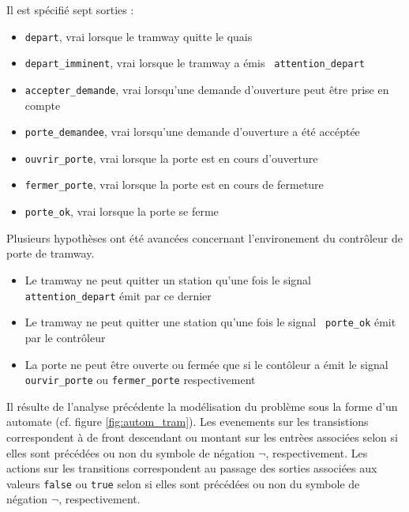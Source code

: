 \documentclass{article}
\begin{document}
      Il est spécifié sept sorties :
      \begin{itemize}
        \item {\tt depart}, vrai lorsque le tramway quitte le quais
        \item {\tt depart\_imminent}, vrai lorsque le tramway a émis {\tt
          attention\_depart} 
        \item {\tt accepter\_demande}, vrai lorsqu'une demande d'ouverture peut
          être prise en compte
        \item {\tt porte\_demandee}, vrai lorsqu'une demande d'ouverture a été
          accéptée 
        \item {\tt ouvrir\_porte}, vrai lorsque la porte est en cours d'ouverture
        \item {\tt fermer\_porte}, vrai lorsque la porte est en cours de fermeture
        \item {\tt porte\_ok}, vrai lorsque la porte se ferme
      \end{itemize} \vspace{1em}

      Plusieurs hypothèses ont été avancées concernant l'environement du
      contrôleur de porte de tramway.
      \begin{itemize}
        \item Le tramway ne peut quitter un station qu'une fois le signal {\tt
          attention\_depart} émit par ce dernier
        \item Le tramway ne peut quitter une station qu'une fois le signal {\tt
          porte\_ok} émit par le contrôleur
        \item La porte ne peut être ouverte ou fermée que si le contôleur a émit
          le signal {\tt ourvir\_porte} ou {\tt fermer\_porte} respectivement
      \end{itemize} \vspace{1em}


      Il résulte de l'analyse précédente la modélisation du problème sous la
      forme d'un automate (cf. figure \ref{fig:autom_tram}).  Les evenements sur
      les transistions correspondent à de front descendant ou montant sur les
      entrèes associées selon si elles sont précédées ou non du symbole de
      négation $\lnot$, respectivement.  Les actions sur les transitions
      correspondent au passage des sorties associées aux valeurs {\tt false} ou
      {\tt true} selon si elles sont précédées ou non du symbole de négation
      $\lnot$, respectivement.
\end{document}
